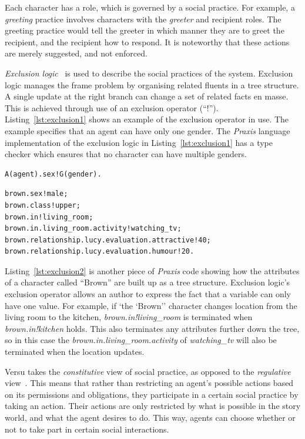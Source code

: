 \documentclass[11pt]{report}
\begin{document}
Each character has a role, which is governed by a social practice. For example, a \emph{greeting} practice involves characters with the \emph{greeter} and recipient roles. The greeting practice would tell the greeter in which manner they are to greet the recipient, and the recipient how to respond. It is noteworthy that these actions are merely suggested, and not enforced.

\emph{Exclusion logic}~\citep{evans2010introducing} is used to describe the
social practices of the system. Exclusion logic manages the frame problem by
organising related fluents in a tree structure. A single update at the right
branch can change a set of related facts en masse. This is achieved through use
of an exclusion operator (``!''). Listing~\ref{lst:exclusion1} shows an example
of the exclusion operator in use. The example specifies that an agent can have
only one gender. The \emph{Praxis} language implementation of the exclusion
logic in Listing~\ref{lst:exclusion1} has a type checker which ensures that no character can have multiple genders.

\begin{lstlisting}[float,label=lst:exclusion1,caption=nextHopInfo: caption]
A(agent).sex!G(gender).
\end{lstlisting}

\begin{lstlisting}[float,label=lst:exclusion2,caption=Description of ``Brown'' character.]
brown.sex!male;
brown.class!upper;
brown.in!living_room;
brown.in.living_room.activity!watching_tv;
brown.relationship.lucy.evaluation.attractive!40;
brown.relationship.lucy.evaluation.humour!20.
\end{lstlisting}

Listing~\ref{lst:exclusion2} is another piece of \emph{Praxis} code showing how the attributes of a character called
``Brown'' are built up as a tree structure.
Exclusion logic's exclusion operator allows an author to express the fact that a
variable can only have one value. For example, if `the `Brown'' character
changes location from the living room to the kitchen,
\emph{brown.in!living\_room} is terminated when \emph{brown.in!kitchen} holds.
This also terminates any attributes further down the tree, so in this case the
\emph{brown.in.living\_room.activity} of \emph{watching_tv} will also be
terminated when the location updates.

Versu takes the \emph{constitutive} view of social practice, as opposed to the
\emph{regulative} view~\citep{SJP:SJP658}. This means that rather than restricting an agent's possible actions based on its permissions and obligations, they participate in a certain social practice by taking an action. Their actions are only restricted by what is possible in the story world, and what the agent desires to do. This way, agents can choose whether or not to take part in certain social interactions.
\end{document}
